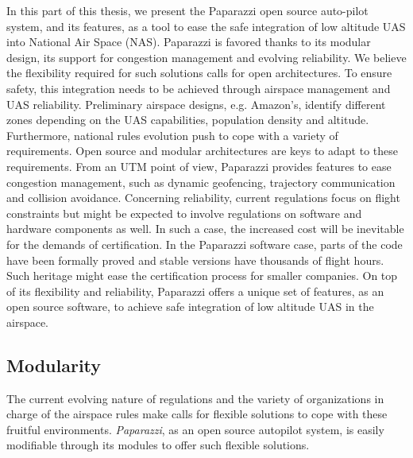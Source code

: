 In this part of this thesis, we present the Paparazzi open source auto-pilot system, and its features, as a tool to ease the safe integration of low altitude UAS into National Air Space (NAS). 
Paparazzi is favored thanks to its modular design, its support for congestion management and evolving reliability.
We believe the flexibility required for such solutions calls for open architectures. To ensure safety, this integration needs to be achieved through airspace management and UAS reliability.
Preliminary airspace designs, e.g. Amazon's, identify different zones depending on the UAS capabilities, population density and altitude. 
Furthermore, national rules evolution push to cope with a variety of requirements. Open source and modular architectures are keys to adapt to these requirements. 
From an UTM point of view, Paparazzi provides features to ease congestion management, such as dynamic geofencing, trajectory communication and collision avoidance. 
Concerning reliability, current regulations focus on flight constraints but might be expected to involve regulations on software and hardware components as well. 
In such a case, the increased cost will be inevitable for the demands of certification. 
In the Paparazzi software case, parts of the code have been formally proved and stable versions have thousands of flight hours. Such heritage might ease the certification process for smaller companies.
On top of its flexibility and reliability, Paparazzi offers a unique set of features, as an open source software, to achieve safe integration of low altitude UAS in the airspace.


\subsection{Modularity}
The current evolving nature of regulations and the variety of organizations in charge of the airspace rules make calls for flexible solutions to cope with these fruitful environments. \emph{Paparazzi}, as an open source autopilot system, is easily modifiable through its modules to offer such flexible solutions.  

